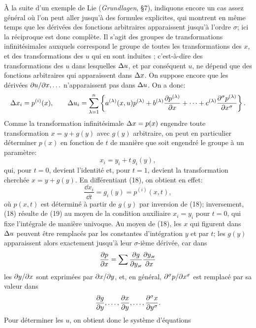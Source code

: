 À la suite d'un exemple de Lie (\emph{Grundlagen}, \S{}7), indiquons encore un cas assez général où l'on peut aller jusqu'à des formules explicites, qui montrent en même temps que les dérivées des fonctions arbitraires apparaissent jusqu'à l'ordre \(\sigma\); ici la réciproque est donc complète. Il s'agit des groupes de transformations infinitésimales auxquels correspond le groupe de toutes les transformations des \(x\), et des transformations des \(u\) qui en sont \og induites \fg{}; c'est-à-dire des transformations des \(u\) dans lesquelles \(\Delta u\), et par conséquent \(u\), ne dépend que des fonctions arbitraires qui apparaissent dans \(\Delta x\). On suppose encore que les dérivées \(\partial u/\partial x,\ldots\) n'apparaissent pas dans \(\Delta u\). On a donc:
\[
\Delta x_i=p^{(i)}(x),\qquad
\Delta u_i=
\sum_{\lambda=1}^{n}\left\{
a^{(\lambda)}(x,u)p^{(\lambda)}
+b^{(\lambda)}\frac{\partial p^{(\lambda)}}{\partial x}
+\cdots+
c^{(\lambda)}\frac{\partial^\sigma p^{(\lambda)}}{\partial x^\sigma}
\right\}.
\]
Comme la transformation infinitésimale \(\Delta x=p(x)\) engendre toute transformation \(x=y+g(y)\) avec \(g(y)\) arbitraire, on peut en particulier déterminer \(p(x)\) en fonction de \(t\) de manière que soit engendré le groupe à un paramètre:
\begin{equation}
x_i=y_i+t\,g_i(y),
\tag{18}
\end{equation}
qui, pour \(t=0\), devient l'identité et, pour \(t=1\), devient la transformation cherchée \(x=y+g(y)\). En différentiant (18), on obtient en effet:
\begin{equation}
\frac{\dd x_i}{\dd t}=g_i(y)=p^{(i)}(x,t),
\tag{19}
\end{equation}
où \(p(x,t)\) est déterminé à partir de \(g(y)\) par inversion de (18); inversement, (18) résulte de (19) au moyen de la condition auxiliaire \(x_i=y_i\) pour \(t=0\), qui fixe l'intégrale de manière univoque. Au moyen de (18), les \(x\) qui figurent dans \(\Delta u\) peuvent être remplacés par les constantes d'intégration \(y\) et par \(t\); les \(g(y)\) apparaissent alors exactement jusqu'à leur \(\sigma\)-ième dérivée, car dans
\[
\frac{\partial p}{\partial x}=\sum\frac{\partial g}{\partial y_\varkappa}\frac{\partial y_\varkappa}{\partial x}
\]
les \(\partial y/\partial x\) sont exprimées par \(\partial x/\partial y\), et, en général, \(\partial^\sigma p/\partial x^\sigma\) est remplacé par sa valeur dans
\[
\frac{\partial g}{\partial y},\ldots,\frac{\partial x}{\partial y},\ldots,\frac{\partial^\sigma x}{\partial y^\sigma}.
\]
Pour déterminer les \(u\), on obtient donc le système d'équations
